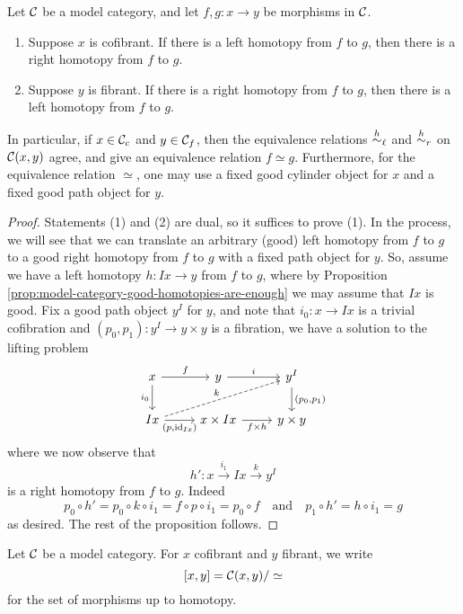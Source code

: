 \begin{propositiondef}\label{prop:model-category-left-right-homotopy-interchange}
	Let \(\mathcal{C}\) be a model category, and let \(f,g\!:x\to y\) be morphisms in \(\mathcal{C}\).
	\begin{enumerate}[label=(\arabic*)]
		\item Suppose \(x\) is cofibrant. If there is a left homotopy from \(f\) to \(g\), then there is a right homotopy from \(f\) to \(g\).
		\item Suppose \(y\) is fibrant. If there is a right homotopy from \(f\) to \(g\), then there is a left homotopy from \(f\) to \(g\).
	\end{enumerate}
	In particular, if \(x\in\mathcal{C}_c\) and \(y\in\mathcal{C}_f\), then the equivalence relations \(\overset{h}{\sim}_\ell\) and \(\overset{h}{\sim}_r\) on \(\mathcal{C}(x,y)\)
	agree, and give an equivalence relation \(f\simeq g\). Furthermore, for the equivalence relation \(\simeq\), one may use a fixed good cylinder
	object for \(x\) and a fixed good path object for \(y\).
\end{propositiondef}
\begin{proof}
Statements (1) and (2) are dual, so it suffices to prove (1). In the process, we will see that we can translate an arbitrary (good) left homotopy from \(f\) to \(g\)
to a good right homotopy from \(f\) to \(g\) with a fixed path object for \(y\). So, assume we have a left homotopy \(h\!:Ix\to y\) from \(f\) to \(g\), where by Proposition \ref{prop:model-category-good-homotopies-are-enough}
we may assume that \(Ix\) is good. Fix a good path object \(y^I\) for \(y\), and note that \(i_0\!:x\to Ix\) is a trivial cofibration and \((p_0,p_1)\!:y^I \to y\times y\)
is a fibration, we have  a solution to the lifting problem
\[
	\begin{tikzcd}
		x\ar[r,"f"]\ar[d,"i_0"'] & y \ar[r,"i"] & y^I\ar[d,"{(p_0,p_1)}"] \\
		Ix\ar[r,"{(p,\id_{Ix})}"']\ar[urr,dashed,"k"] & x\times Ix \ar[r,"{f\times h}"'] & y\times y
	\end{tikzcd}
\]
where we now observe that
\[ h'\!: x \overset{i_1}\to Ix \overset{k}\to y^I \]
is a right homotopy from \(f\) to \(g\). Indeed
\[ p_0\circ h' = p_0\circ k\circ i_1 = f\circ p\circ i_1 = p_0\circ f\quad\text{and}\quad p_1\circ h' = h\circ i_1 = g \]
as desired. The rest of the proposition follows.
\end{proof}

\begin{notation}
	Let \(\mathcal{C}\) be a model category. For \(x\) cofibrant and \(y\) fibrant, we write
	\[ [x,y] = \mathcal{C}(x,y)/\simeq \]
	for the set of morphisms up to homotopy.
\end{notation}

